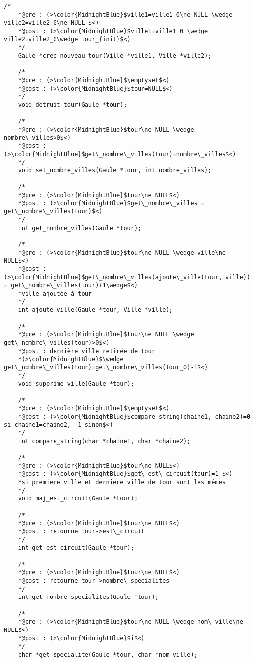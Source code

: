 \documentclass[a4paper, 11pt, oneside]{article}
\begin{document}
\begin{lstlisting}[caption = {Spécification des fonctions et procédures du header "gaule.h"}]
    /*
    *@pre : (>\color{MidnightBlue}$ville1=ville1_0\ne NULL \wedge ville2=ville2_0\ne NULL $<)
    *@post : (>\color{MidnightBlue}$ville1=ville1_0 \wedge ville2=ville2_0\wedge tour_{init}$<)
    */
    Gaule *cree_nouveau_tour(Ville *ville1, Ville *ville2);

    /*
    *@pre : (>\color{MidnightBlue}$\emptyset$<)
    *@post : (>\color{MidnightBlue}$tour=NULL$<)
    */
    void detruit_tour(Gaule *tour);

    /*
    *@pre : (>\color{MidnightBlue}$tour\ne NULL \wedge nombre\_villes>0$<)
    *@post : (>\color{MidnightBlue}$get\_nombre\_villes(tour)=nombre\_villes$<)
    */
    void set_nombre_villes(Gaule *tour, int nombre_villes);

    /*
    *@pre : (>\color{MidnightBlue}$tour\ne NULL$<)
    *@post : (>\color{MidnightBlue}$get\_nombre\_villes = get\_nombre\_villes(tour)$<)
    */
    int get_nombre_villes(Gaule *tour);

    /*
    *@pre : (>\color{MidnightBlue}$tour\ne NULL \wedge ville\ne NULL$<)
    *@post : (>\color{MidnightBlue}$get\_nombre\_villes(ajoute\_ville(tour, ville)) = get\_nombre\_villes(tour)+1\wedge$<)
    *ville ajoutée à tour
    */
    int ajoute_ville(Gaule *tour, Ville *ville);

    /*
    *@pre : (>\color{MidnightBlue}$tour\ne NULL \wedge get\_nombre\_villes(tour)>0$<)
    *@post : dernière ville retirée de tour 
    *(>\color{MidnightBlue}$\wedge get\_nombre\_villes(tour)=get\_nombre\_villes(tour_0)-1$<)
    */
    void supprime_ville(Gaule *tour);

    /*
    *@pre : (>\color{MidnightBlue}$\emptyset$<)
    *@post : (>\color{MidnightBlue}$compare_string(chaine1, chaine2)=0 si chaine1=chaine2, -1 sinon$<)
    */
    int compare_string(char *chaine1, char *chaine2);

    /*
    *@pre : (>\color{MidnightBlue}$tour\ne NULL$<)
    *@post : (>\color{MidnightBlue}$get\_est\_circuit(tour)=1 $<)
    *si premiere ville et derniere ville de tour sont les mêmes
    */
    void maj_est_circuit(Gaule *tour);

    /*
    *@pre : (>\color{MidnightBlue}$tour\ne NULL$<)
    *@post : retourne tour->est\_circuit
    */
    int get_est_circuit(Gaule *tour);

    /*
    *@pre : (>\color{MidnightBlue}$tour\ne NULL$<)
    *@post : retourne tour_>nombre\_specialites
    */
    int get_nombre_specialites(Gaule *tour);

    /*
    *@pre : (>\color{MidnightBlue}$tour\ne NULL \wedge nom\_ville\ne NULL$<)
    *@post : (>\color{MidnightBlue}$i$<)
    */
    char *get_specialite(Gaule *tour, char *nom_ville);
\end{lstlisting}
\end{document}
